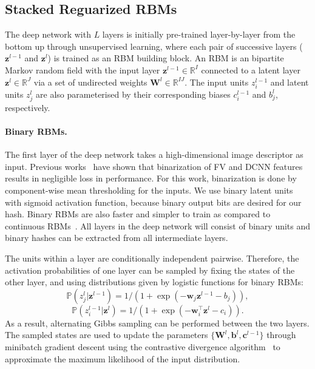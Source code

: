 \documentclass[10pt,twocolumn,letterpaper]{article}
\begin{document}
\subsection{Stacked Reguarized RBMs}
\label{sec:srbm}

The deep network with $L$ layers is initially pre-trained layer-by-layer from the bottom up through unsupervised learning, where each pair of successive layers ($\mathbf{z}^{l-1}$ and $\mathbf{z}^{l}$) is trained as an RBM building block. An RBM is an bipartite Markov random field with the input layer $\mathbf{z}^{l-1}\in\mathbb{R}^{I}$ connected to a latent layer $\mathbf{z}^{l}\in\mathbb{R}^{J}$ via a set of undirected weights $\mathbf{W}^{l}\in\mathbb{R}^{I J}$. The input units $z_{i}^{l-1}$ and latent units $z_{j}^{l}$ are also parameterised by their corresponding biases ${c}_{i}^{l-1}$ and $b_{j}^{l}$, respectively.

\paragraph{Binary RBMs.}
The first layer of the deep network takes a high-dimensional image descriptor as input. Previous works~\cite{Perronnin_CVPR_10,agrawal14analyzing} have shown that binarization of FV and DCNN features results in negligible loss in performance. For this work, binarization is done by component-wise mean thresholding for the inputs. 
We use binary latent units with sigmoid activation function, because binary output bits are desired for our hash. 
Binary RBMs are also faster and simpler to train as compared to continuous RBMs~\cite{RBMPracticalGuide}. 
All layers in the deep network will consist of binary units and binary hashes can be extracted from all intermediate layers.

The units within a layer are conditionally independent pairwise.
Therefore, the activation probabilities of one layer can be sampled by fixing the states of the other layer, and using distributions given by logistic functions for binary RBMs:
\begin{equation}
\mathbb{P}(z^{l}_j| \mathbf{z}^{l-1}) = 1/(1+\exp(-\mathbf{w}_{j} \mathbf{z}^{l-1} - b_j)),
\label{eq:alt_1}
\end{equation}
\begin{equation}
\mathbb{P}(z^{l-1}_i| \mathbf{z}^{l}) = 1/(1+\exp(-\mathbf{w}_{i}^{\top}\mathbf{z}^{l}-c_i)).
\label{eq:alt_2}
\end{equation}
As a result, alternating Gibbs sampling can be performed between the two layers. The sampled states are used to update the parameters $\{\mathbf{W}^{l},\mathbf{b}^{l},\mathbf{c}^{l-1}\}$ through minibatch gradient descent using the contrastive divergence algorithm~\cite{hintonCD} to approximate the maximum likelihood of the input distribution.
\end{document}
